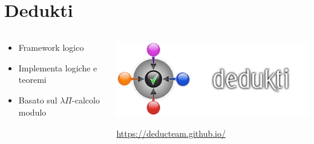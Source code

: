 \documentclass{beamer}
\begin{document}
\section{Dedukti}
\begin{frame}
\begin{columns}

\begin{column}{.5\textwidth}
\begin{itemize}
  \item Framework logico
  \vspace{1.5em}
  \item Implementa logiche e teoremi
  \vspace{1.5em}
  \item Basato sul $\lambda\Pi$-calcolo modulo
\end{itemize}
\end{column}

\begin{column}{.5\textwidth}
\includegraphics[scale=1]{dedukti2.png}
\begin{center}
    \href{https://deducteam.github.io/}{https://deducteam.github.io/}
\end{center}
\end{column}
\end{columns}


\end{frame}
\end{document}
